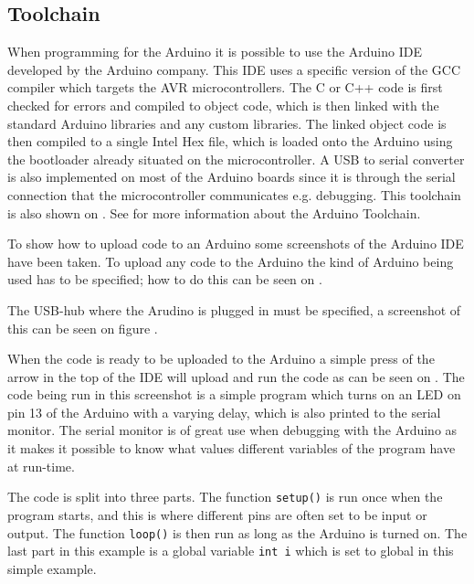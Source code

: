 \subsection{Toolchain}
When programming for the Arduino it is possible to use the Arduino IDE developed by the Arduino company.
This IDE uses a specific version of the GCC compiler which targets the AVR microcontrollers.
The C or C++ code is first checked for errors and compiled to object code, which is then linked with the standard Arduino libraries and any custom libraries.
The linked object code is then compiled to a single Intel Hex file, which is loaded onto the Arduino using the bootloader already situated on the microcontroller.
A USB to serial converter is also implemented on most of the Arduino boards since it is through the serial connection that the microcontroller communicates e.g. debugging.
This toolchain is also shown on . 
See \cite{2015ArduinoToolchain} for more information about the Arduino Toolchain.


\noindent
To show how to upload code to an Arduino some screenshots of the Arduino IDE have been taken.
To upload any code to the Arduino the kind of Arduino being used has to be specified; how to do this can be seen on .

The USB-hub where the Arudino is plugged in must be specified, a screenshot of this can be seen on figure .

When the code is ready to be uploaded to the Arduino a simple press of the arrow in the top of the IDE will upload and run the code as can be seen on . 
The code being run in this screenshot is a simple program which turns on an LED on pin 13 of the Arduino with a varying delay, which is also printed to the serial monitor.
The serial monitor is of great use when debugging with the Arduino as it makes it possible to know what values different variables of the program have at run-time.

The code is split into three parts.
The function \texttt{setup()} is run once when the program starts, and this is where different pins are often set to be input or output.
The function \texttt{loop()} is then run as long as the Arduino is turned on. 
The last part in this example is a global variable \texttt{int i} which is set to global in this simple example.

